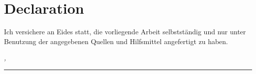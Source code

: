 %
\chapter*{Declaration}
\label{sec:declaration}
\thispagestyle{empty}
\vfill

Ich versichere an Eides statt, die vorliegende Arbeit selbstständig und nur unter Benutzung der angegebenen Quellen und Hilfsmittel angefertigt zu haben.
\bigskip

\noindent\textit{\thesisUniversityCity, \thesisDate}

\smallskip

\begin{flushright}
    \begin{minipage}{5cm}
        \rule{\textwidth}{1pt}
        \centering{\thesisName}
    \end{minipage}
\end{flushright}

